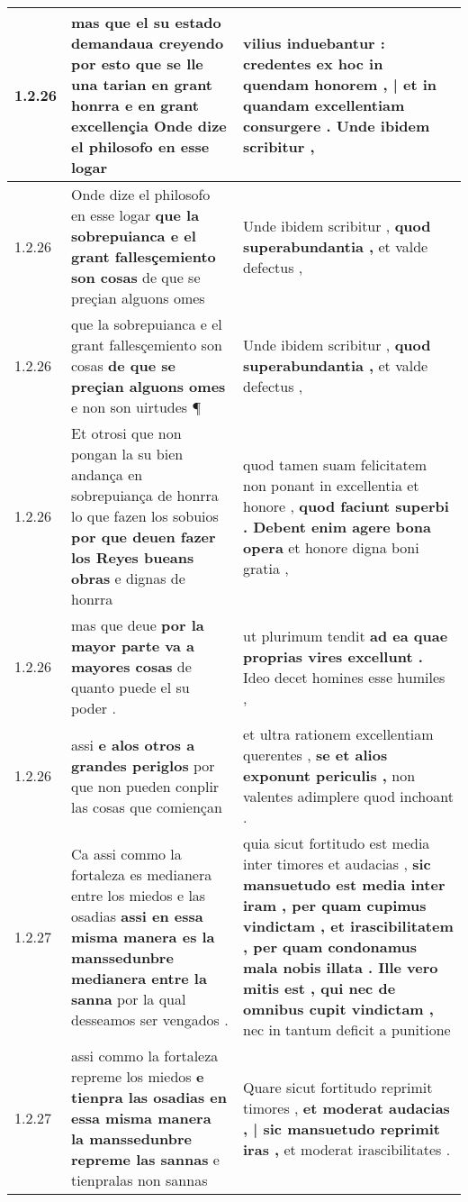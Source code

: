 \begin{tabular}{|p{1cm}|p{6.5cm}|p{6.5cm}|}
1.2.26 & mas que el su estado demandaua creyendo \textbf{ por esto que se lle una tarian en grant honrra e en grant excellençia } Onde dize el philosofo en esse logar & vilius induebantur : \textbf{ credentes ex hoc in quendam honorem , | et in quandam excellentiam consurgere . } Unde ibidem scribitur , \\\hline
1.2.26 & Onde dize el philosofo en esse logar \textbf{ que la sobrepuianca e el grant fallesçemiento son cosas } de que se preçian alguons omes & Unde ibidem scribitur , \textbf{ quod superabundantia , } et valde defectus , \\\hline
1.2.26 & que la sobrepuianca e el grant fallesçemiento son cosas \textbf{ de que se preçian alguons omes } e non son uirtudes ¶ & Unde ibidem scribitur , \textbf{ quod superabundantia , } et valde defectus , \\\hline
1.2.26 & Et otrosi que non pongan la su bien andança en sobrepuiança de honrra lo que fazen los sobuios \textbf{ por que deuen fazer los Reyes bueans obras } e dignas de honrra & quod tamen suam felicitatem non ponant in excellentia et honore , \textbf{ quod faciunt superbi . Debent enim agere bona opera } et honore digna boni gratia , \\\hline
1.2.26 & mas que deue \textbf{ por la mayor parte va a mayores cosas } de quanto puede el su poder . & ut plurimum tendit \textbf{ ad ea quae proprias vires excellunt . } Ideo decet homines esse humiles , \\\hline
1.2.26 & assi \textbf{ e alos otros a grandes periglos } por que non pueden conplir las cosas que comiençan & et ultra rationem excellentiam querentes , \textbf{ se et alios exponunt periculis , } non valentes adimplere quod inchoant . \\\hline
1.2.27 & Ca assi commo la fortaleza es medianera entre los miedos e las osadias \textbf{ assi en essa misma manera es la manssedunbre medianera entre la sanna } por la qual desseamos ser vengados . & quia sicut fortitudo est media inter timores et audacias , \textbf{ sic mansuetudo est media inter iram , per quam cupimus vindictam , et irascibilitatem , per quam condonamus mala nobis illata . Ille vero mitis est , qui nec de omnibus cupit vindictam , } nec in tantum deficit a punitione \\\hline
1.2.27 & assi commo la fortaleza repreme los miedos \textbf{ e tienpra las osadias en essa misma manera la manssedunbre repreme las sannas } e tienpralas non sannas & Quare sicut fortitudo reprimit timores , \textbf{ et moderat audacias , | sic mansuetudo reprimit iras , } et moderat irascibilitates . \\\hline

\end{tabular}
